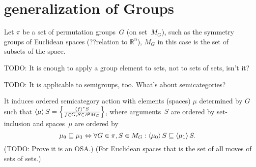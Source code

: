 \chapter{generalization of Groups}

Let $\pi$ be a set of permutation groups~$G$ (on set~$M_G$), such as the symmetry groups of Euclidean spaces
(??relation to $\mathbb{R}^n$), $M_G$ in this case is the set of subsets of the space.

TODO: It is enough to apply a group element to sets, not to sets of sets, isn't it?

TODO: It is applicable to semigroups, too. What's about semicategories?

It induces ordered semicategory action with elements (spaces) $\mu$ determined by $G$ such that
$\left\langle \mu\right\rangle S=\left\{ \frac{\left\langle f\right\rangle ^{\ast}S}{f\in G,S\in\mathscr{P} M_G}\right\}$, where arguments~$S$ are ordered by set-inclusion
and spaces~$\mu$ are ordered by
\[ \mu_0\sqsubseteq\mu_1\Leftrightarrow\forall G\in\pi, S\in M_G:\left\langle \mu_0\right\rangle S\sqsubseteq\left\langle \mu_1\right\rangle S. \]
(TODO: Prove it is an OSA.)
(For Euclidean spaces that is the set of all moves of sets of sets.)